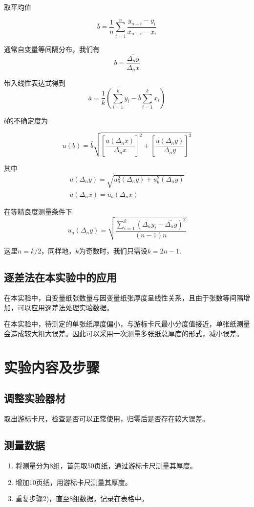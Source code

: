 \documentclass{jiwu}
\begin{document}
    取平均值\par

    $$
        \bar{b}=\dfrac{1}{n}\sum_{i=1}^n \dfrac{y_{n+i}-y_i}{x_{n+i}-x_i}
    $$
    
    通常自变量等间隔分布，我们有
    $$\bar{b}=\dfrac{\overline{\Delta_ny}}{\Delta_nx}$$

    带入线性表达式得到
    $$\bar{a}=\dfrac{1}{k}(\sum_{i=1}^ky_i-\bar{b}\sum_{i=1}^kx_i)$$

    $b$的不确定度为

    $$u(b)=\bar{b}\sqrt{\left[\dfrac{u(\Delta_nx)}{\Delta_nx}\right]^2+\left[\dfrac{u(\Delta_ny)}{\Delta_ny}\right]^2}$$

    其中
    $$
        \begin{array}{l}
            u(\Delta_ny)=\sqrt{u_a^2(\Delta_ny)+u_b^2(\Delta_ny)}\\
            u(\Delta_nx)=u_b(\Delta_nx)
        \end{array}
    $$

    在等精良度测量条件下
    $$
        u_a(\Delta_ny)=\sqrt{\dfrac{\sum_{i=1}^k(\Delta_ny_i-\overline{\Delta_ny})^2}{(n-1)n}}
    $$

    这里$n=k/2$，同样地，$k$为奇数时，我们只需设$k=2n-1$.
    \subsection{逐差法在本实验中的应用}
        在本实验中，自变量纸张数量与因变量纸张厚度呈线性关系，且由于张数等间隔增加，可以应用逐差法处理实验数据。

        在本实验中，待测定的单张纸厚度偏小，与游标卡尺最小分度值接近，单张纸测量会造成较大粗大误差。因此可以采用一次测量多张纸总厚度的形式，减小误差。
\section{实验内容及步骤}
\subsection{调整实验器材}
取出游标卡尺，检查是否可以正常使用，归零后是否存在较大误差。
\subsection{测量数据}
\begin{enumerate}[label=\arabic*)]
    \item 将测量分为8组，首先取50页纸，通过游标卡尺测量其厚度。
    \item 增加10页纸，用游标卡尺测量其厚度。
    \item 重复步骤2)，直至8组数据，记录在表格中。
\end{enumerate}
\end{document}
